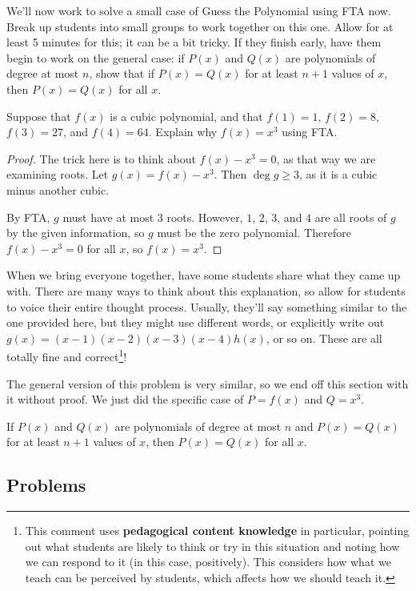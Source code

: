 We'll now work to solve a small case of Guess the Polynomial using FTA now. Break up students into small groups to work together on this one. Allow for at least 5 minutes for this; it can be a bit tricky. If they finish early, have them begin to work on the general case: if $P(x)$ and $Q(x)$ are polynomials of degree at most $n$, show that if $P(x) = Q(x)$ for at least $n+1$ values of $x$, then $P(x) = Q(x)$ for all $x$.
\begin{example}
    Suppose that $f(x)$ is a cubic polynomial, and that $f(1) = 1$, $f(2) = 8$, $f(3) = 27$, and $f(4) = 64$. Explain why $f(x) = x^3$ using FTA.
\end{example}
\begin{proof}
    The trick here is to think about $f(x) - x^3 = 0$, as that way we are examining roots. Let $g(x) = f(x) - x^3$. Then $\deg g \ge 3$, as it is a cubic minus another cubic.

    By FTA, $g$ must have at most $3$ roots. However, $1$, $2$, $3$, and $4$ are all roots of $g$ by the given information, so $g$ must be the zero polynomial. Therefore $f(x) - x^3 = 0$ for all $x$, so $f(x) = x^3$.
\end{proof}

When we bring everyone together, have some students share what they came up with. There are many ways to think about this explanation, so allow for students to voice their entire thought process. Usually, they'll say something similar to the one provided here, but they might use different words, or explicitly write out $g(x) = (x-1)(x-2)(x-3)(x-4)h(x)$, or so on. These are all totally fine and correct\footnote{This comment uses \textbf{pedagogical content knowledge} in particular, pointing out what students are likely to think or try in this situation and noting how we can respond to it (in this case, positively). This considers how what we teach can be perceived by students, which affects how we should teach it.}!

The general version of this problem is very similar, so we end off this section with it without proof. We just did the specific case of $P = f(x)$ and $Q = x^3$.
\begin{theorem}
    If $P(x)$ and $Q(x)$ are polynomials of degree at most $n$ and $P(x) = Q(x)$ for at least $n+1$ values of $x$, then $P(x) = Q(x)$ for all $x$.
\end{theorem}

\subsection{Problems}

